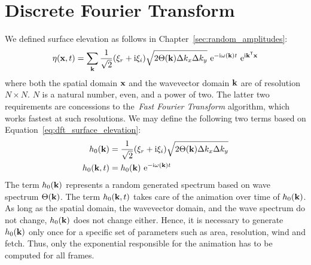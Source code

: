 \section{Discrete Fourier Transform}
We defined surface elevation as follows in Chapter~\ref{sec:random_amplitudes}:
\begin{equation}
\label{eq:dft_surface_elevation}
\eta(\mathbf{x}, t) = 
\sum_{\mathbf{k}}\frac{1}{\sqrt{2}}(\xi_r+\mathrm{i}\xi_i)
\sqrt{2\Theta(\mathbf{k})\Delta k_x \Delta k_y} 
~\mathrm{e}^{-\mathrm{i}\omega(\mathbf{k})t}
~\mathrm{e}^{\mathrm{i}\mathbf{k}^{\mathsf{T}}\mathbf{x}}
\end{equation}
where both the spatial domain $\mathbf{x}$ and the wavevector domain $\mathbf{k}$ are
of resolution $N \times N$. $N$ is a natural number, even, and a power of two.
The latter two requirements are concessions to the~\emph{Fast Fourier Transform}
algorithm, which works fastest at such resolutions. We may define the following
two terms based on Equation~\ref{eq:dft_surface_elevation}:
\begin{align}
\label{eq:dft_h0_k}
h_0(\mathbf{k})   &= \frac{1}{\sqrt{2}}(\xi_r+\mathrm{i}\xi_i)\sqrt{2\Theta(\mathbf{k})\Delta k_x \Delta k_y} \\
\label{eq:dft_h0_k_t}
h_0(\mathbf{k},t) &= h_0(\mathbf{k})~\mathrm{e}^{-\mathrm{i}\omega(\mathbf{k})t}
\end{align}
The term $h_0(\mathbf{k})$ represents a random generated spectrum based on wave
spectrum $\Theta(\mathbf{k})$. The term $h_0(\mathbf{k},t)$ takes care of the
animation over time of $h_0(\mathbf{k})$. As long as the spatial domain,
the wavevector domain, and the wave spectrum do not change, $h_0(\mathbf{k})$
does not change either. Hence, it is necessary to generate $h_0(\mathbf{k})$ only once
for a specific set of parameters such as area, resolution, wind and fetch. Thus,
only the exponential responsible for the animation has to be computed for all
frames.
%
